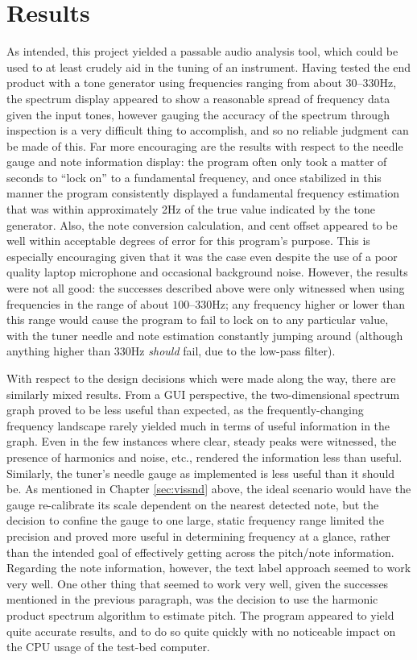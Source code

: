 \documentclass[12pt]{report}
\begin{document}
\chapter{Results}
\indent As intended, this project yielded a passable audio analysis tool, which could be used to at least crudely aid in the tuning of an instrument. Having tested the end product with a tone generator using frequencies ranging from about $30$--$330$Hz, the spectrum display appeared to show a reasonable spread of frequency data given the input tones, however gauging the accuracy of the spectrum through inspection is a very difficult thing to accomplish, and so no reliable judgment can be made of this. Far more encouraging are the results with respect to the needle gauge and note information display: the program often only took a matter of seconds to ``lock on'' to a fundamental frequency, and once stabilized in this manner the program consistently displayed a fundamental frequency estimation that was within approximately 2Hz of the true value indicated by the tone generator. Also, the note conversion calculation, and cent offset appeared to be well within acceptable degrees of error for this program's purpose. This is especially encouraging given that it was the case even despite the use of a poor quality laptop microphone and occasional background noise. However, the results were not all good: the successes described above were only witnessed when using frequencies in the range of about $100$--$330$Hz; any frequency higher or lower than this range would cause the program to fail to lock on to any particular value, with the tuner needle and note estimation constantly jumping around (although anything higher than $330$Hz \emph{should} fail, due to the low-pass filter). 

\indent With respect to the design decisions which were made along the way, there are similarly mixed results. From a GUI perspective, the two-dimensional spectrum graph proved to be less useful than expected, as the frequently-changing frequency landscape rarely yielded much in terms of useful information in the graph. Even in the few instances where clear, steady peaks were witnessed, the presence of harmonics and noise, etc., rendered the information less than useful. Similarly, the tuner's needle gauge as implemented is less useful than it should be. As mentioned in Chapter \ref{sec:vissnd} above, the ideal scenario would have the gauge re-calibrate its scale dependent on the nearest detected note, but the decision to confine the gauge to one large, static frequency range limited the precision and proved more useful in determining frequency at a glance, rather than the intended goal of effectively getting across the pitch/note information. Regarding the note information, however, the text label approach seemed to work very well. One other thing that seemed to work very well, given the successes mentioned in the previous paragraph, was the decision to use the harmonic product spectrum algorithm to estimate pitch. The program appeared to yield quite accurate results, and to do so quite quickly with no noticeable impact on the CPU usage of the test-bed computer.
\end{document}

